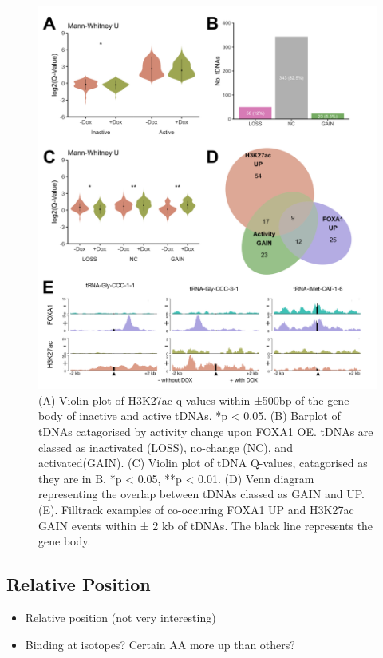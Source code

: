 \documentclass[
  12pt,
]{article}
\begin{document}
\begin{figure}[H]
\includegraphics[width=1\linewidth]{../images/results-03} \caption{(A) Violin plot of H3K27ac q-values within ±500bp of the gene body of inactive and active tDNAs. *p < 0.05. (B) Barplot of tDNAs catagorised by activity change upon FOXA1 OE. tDNAs are classed as inactivated (LOSS), no-change (NC), and activated(GAIN). (C) Violin plot of tDNA Q-values, catagorised as they are in B. *p < 0.05, **p < 0.01. (D) Venn diagram representing the overlap between tDNAs classed as GAIN and UP. (E). Filltrack examples of co-occuring FOXA1 UP and H3K27ac GAIN events within ± 2 kb of tDNAs. The black line represents the gene body.}\label{fig:results-3}
\end{figure}

\hypertarget{relative-position}{%
\subsection{Relative Position}\label{relative-position}}

\begin{itemize}
\item
  Relative position (not very interesting)
\item
  Binding at isotopes?
  Certain AA more up than others?
\end{itemize}
\end{document}
